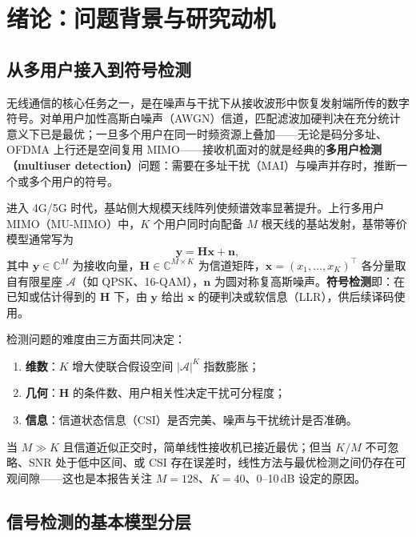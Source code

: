 \chapter{绪论：问题背景与研究动机}

\section{从多用户接入到符号检测}

无线通信的核心任务之一，是在噪声与干扰下从接收波形中恢复发射端所传的数字符号。对单用户加性高斯白噪声（AWGN）信道，匹配滤波加硬判决在充分统计意义下已是最优；一旦多个用户在同一时频资源上叠加——无论是码分多址、OFDMA 上行还是空间复用 MIMO——接收机面对的就是经典的\textbf{多用户检测（multiuser detection）}问题\cite{verdú1998,tse2005}：需要在多址干扰（MAI）与噪声并存时，推断一个或多个用户的符号。

进入 4G/5G 时代，基站侧大规模天线阵列使频谱效率显著提升\cite{marzetta2010,larsson2014,bjornson2017}。上行多用户 MIMO（MU-MIMO）中，$K$ 个用户同时向配备 $M$ 根天线的基站发射，基带等价模型通常写为
\begin{equation}
\mathbf{y}=\mathbf{H}\mathbf{x}+\mathbf{n},
\label{eq:mimo-basic}
\end{equation}
其中 $\mathbf{y}\in\mathbb{C}^{M}$ 为接收向量，$\mathbf{H}\in\mathbb{C}^{M\times K}$ 为信道矩阵，$\mathbf{x}=(x_1,\ldots,x_K)^\top$ 各分量取自有限星座 $\mathcal{A}$（如 QPSK、16-QAM），$\mathbf{n}$ 为圆对称复高斯噪声。\textbf{符号检测}即：在已知或估计得到的 $\mathbf{H}$ 下，由 $\mathbf{y}$ 给出 $\mathbf{x}$ 的硬判决或软信息（LLR），供后续译码使用。

检测问题的难度由三方面共同决定：
\begin{enumerate}[leftmargin=2em]
  \item \textbf{维数}：$K$ 增大使联合假设空间 $|\mathcal{A}|^K$ 指数膨胀；
  \item \textbf{几何}：$\mathbf{H}$ 的条件数、用户相关性决定干扰可分程度；
  \item \textbf{信息}：信道状态信息（CSI）是否完美、噪声与干扰统计是否准确。
\end{enumerate}
当 $M\gg K$ 且信道近似正交时，简单线性接收机已接近最优\cite{hoydis2013}；但当 $K/M$ 不可忽略、SNR 处于低中区间、或 CSI 存在误差时，线性方法与最优检测之间仍存在可观间隙——这也是本报告关注 $M=128$、$K=40$、0--10\,dB 设定的原因。

\section{信号检测的基本模型分层}

